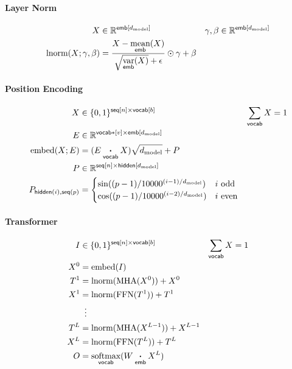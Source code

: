 \documentclass{article}
\newcommand{\reals}[0]{\mathbb{R}}
\newcommand{\dmodel}{d_{\text{model}}}
\begin{document}
\paragraph{Layer Norm}

\begin{align*} 
X &\in \reals^{\nset{emb}{\dmodel}} & \gamma, \beta &\in \reals^{\nset{emb}{\dmodel}} \\
\text{lnorm}(X; \gamma, \beta) &= \frac{X - \nfun{emb}{\text{mean}}(X)}{\sqrt{\nfun{emb}{\text{var}}(X)} + \epsilon} \odot \gamma + \beta 
\end{align*}

\paragraph{Position Encoding}
\begin{align*} 
X &\in \{0, 1\}^{\nset{seq}{n} \times \nset{vocab}{b}} & \nsum{vocab} X &= 1\\
E &\in \reals^{\nset{vocab*}{v} \times \nset{emb}{\dmodel}} \\
\text{embed}(X; E) &= (E \ndot{vocab} X)\sqrt{\dmodel} + P \\
P &\in \reals^{\nset{seq}{n} \times \nset{hidden}{\dmodel}} \\
P_{\nidx{hidden}{i}, \nidx{seq}{p}} &= \begin{cases}
  \sin((p-1) / 10000^{(i-1) / \dmodel}) & \text{$i$ odd} \\ 
  \cos((p-1) / 10000^{(i-2) / \dmodel}) & \text{$i$ even} \\
\end{cases} \\
\end{align*}

\paragraph{Transformer}

\begin{align*} 
I &\in \{0, 1\}^{{\nset{seq}{n} \times \nset{vocab}{b}}} & \nsum{vocab} X &= 1\\
X^0 &= \text{embed}(I)\\
T^1 &= \text{lnorm}(\text{MHA}(X^0)) + X^0\\
X^1 &= \text{lnorm}(\text{FFN}(T^1)) + T^1\\
&\vdotswithin{=} \\
T^{L} &= \text{lnorm}(\text{MHA}(X^{L-1})) + X^{L-1}\\
X^{L} &= \text{lnorm}(\text{FFN}(T^L)) + T^L\\
O &= \nfun{vocab}{softmax}(W \ndot{emb} X^L)
\end{align*}


\end{document}
